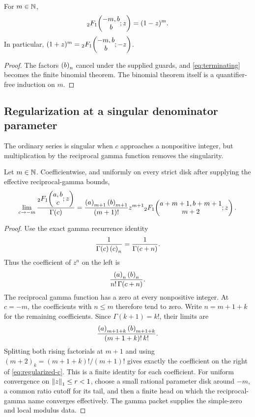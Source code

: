\begin{corollary}\label{cor:binomial-termination}
For \(m\in\mathbb N\),
\[
 {}_2F_1\!\left(\begin{matrix}-m,b\\b\end{matrix};z\right)=(1-z)^m.
\]
In particular, \((1+z)^m={}_2F_1\!\left(\begin{matrix}-m,b\\b\end{matrix};-z\right)\).
\end{corollary}

\begin{proof}
The factors \(\left(b\right)_{n}\) cancel under the supplied guards, and
\eqref{eq:terminating} becomes the finite binomial theorem.  The binomial
theorem itself is a quantifier-free induction on \(m\).
\end{proof}


\subsection{Regularization at a singular denominator parameter}

The ordinary series is singular when \(c\) approaches a nonpositive integer,
but multiplication by the reciprocal gamma function removes the singularity.

\begin{theorem}[Regularized limit at \(c=-m\)]\label{thm:regularized-c}
Let \(m\in\mathbb N\).  Coefficientwise, and uniformly on every strict disk after
supplying the effective reciprocal-gamma bounds,
\begin{equation}\label{eq:regularized-c}
 \lim_{c\to-m}\frac{{}_2F_1\!\left(\begin{matrix}a,b\\c\end{matrix};z\right)}{\Gamma(c)}
 =\frac{\left(a\right)_{m+1}\left(b\right)_{m+1}}{(m+1)!}z^{m+1}
  {}_2F_1\!\left(\begin{matrix}a+m+1,b+m+1\\m+2\end{matrix};z\right).
\end{equation}
\end{theorem}

\begin{proof}
Use the exact gamma recurrence identity
\[
 \frac1{\Gamma(c)\left(c\right)_{n}}=\frac1{\Gamma(c+n)}.
\]
Thus the coefficient of \(z^n\) on the left is
\[
 \frac{\left(a\right)_{n}\left(b\right)_{n}}{n!\,\Gamma(c+n)}.
\]
The reciprocal gamma function has a zero at every nonpositive integer.  At
\(c=-m\), the coefficients with \(n\le m\) therefore tend to zero.  Write
\(n=m+1+k\) for the remaining coefficients.  Since
\(\Gamma(k+1)=k!\), their limits are
\[
 \frac{\left(a\right)_{m+1+k}\left(b\right)_{m+1+k}}
      {(m+1+k)!\,k!}.
\]
Splitting both rising factorials at \(m+1\) and using
\((m+2)_k=(m+1+k)!/(m+1)!\) gives exactly the coefficient on the right of
\eqref{eq:regularized-c}.  This is a finite identity for each coefficient.
For uniform convergence on \(\left\lVert z\right\rVert_1\le r<1\), choose a small rational
parameter disk around \(-m\), a common ratio cutoff for its tail, and then a
finite head on which the reciprocal-gamma name converges effectively.  The
gamma packet supplies the simple-zero and local modulus data.
\end{proof}

